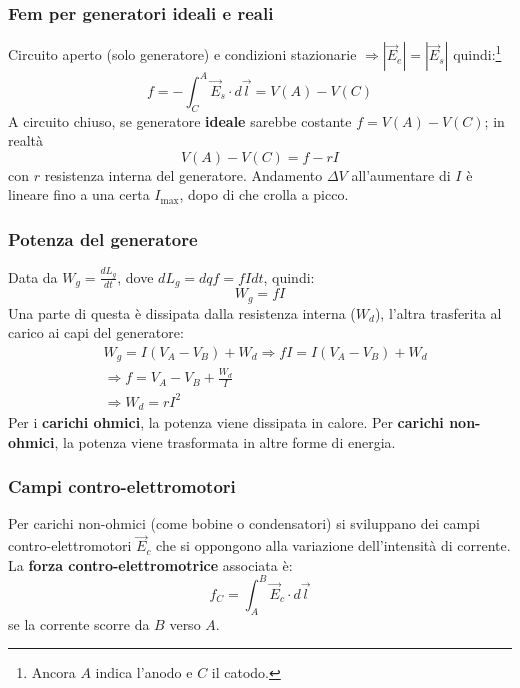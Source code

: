 \documentclass[a4paper]{scrartcl}
\numberwithin{equation}{subsection}
\theoremstyle{style1}
\begin{document}
\subsubsection{Fem per generatori ideali e reali}

Circuito aperto (solo generatore) e condizioni stazionarie $\Rightarrow \left\lvert \vec{E}_e \right\rvert = \left\lvert \vec{E}_s \right\rvert$ quindi:\footnote{Ancora $A$ indica l'anodo e $C$ il catodo.}
\begin{equation}
	f = -\int_{C} ^A \vec{E}_s \cdot d\vec{l} =V(A) - V(C)
\end{equation}
A circuito chiuso, se generatore \textbf{ideale} sarebbe costante $f = V(A) - V(C)$; in realt\`a 
\begin{equation}
	V(A) - V(C) = f - rI
\end{equation}
con $r$ resistenza interna del generatore. Andamento $\Delta V$ all'aumentare di $I$ \`e lineare fino a una certa $I_\text{max}$, dopo di che crolla a picco.
\subsubsection{Potenza del generatore}
Data da $W_g = \frac{d L_g}{d t} $, dove $dL_g = dq f = fI dt$, quindi:
\begin{equation}
	W_g = fI
\end{equation}
Una parte di questa \`e dissipata dalla resistenza interna ($W_d$), l'altra trasferita al carico ai capi del generatore:
\begin{equation}
	\begin{split}
		&W_g = I (V_A -V_B) + W_d \Rightarrow  fI = I (V_A -V_B) + W_d\\
		&\Rightarrow f = V_A -V_B + \frac{W_d}{I}\\
		&\Rightarrow W_d = rI^2
	\end{split}
\end{equation}
Per i \textbf{carichi ohmici}, la potenza viene dissipata in calore. Per \textbf{carichi non-ohmici}, la potenza viene trasformata in altre forme di energia. 

\subsubsection{Campi contro-elettromotori}

Per carichi non-ohmici (come bobine o condensatori) si sviluppano dei campi contro-elettromotori $\vec{E}_c$ che si oppongono alla variazione dell'intensit\`a di corrente. La \textbf{forza contro-elettromotrice} associata \`e:
\begin{equation}
	f_C = \int_{A} ^B \vec{E}_c \cdot d\vec{l}
\end{equation}
se la corrente scorre da $B$ verso $A$.
\end{document}
